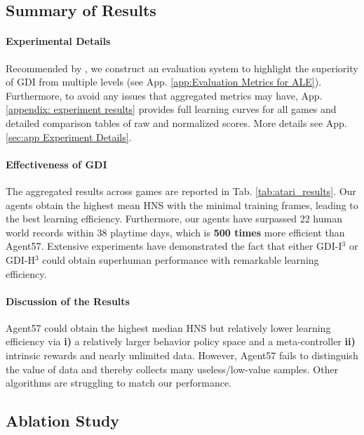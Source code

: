 \subsection{Summary of Results}
\label{sec: Summary of Results}





\paragraph{Experimental Details} Recommended by \citep{agent57,atarihuman}, we construct an evaluation system to highlight the superiority of GDI from multiple levels (see App. \ref{app:Evaluation Metrics for ALE}). Furthermore, to avoid any issues that aggregated metrics may have, App. \ref{appendix: experiment results} provides full learning curves for all games and detailed comparison tables of raw and normalized scores. More details see App. \ref{sec:app Experiment Details}.

\paragraph{Effectiveness of GDI} The aggregated results across games are reported in Tab. \ref{tab:atari_results}. Our agents obtain the highest mean HNS with the minimal training frames, leading to the best learning efficiency. Furthermore, our agents have surpassed 22 human world records within  38 playtime days, which is \textbf{500 times} more efficient than Agent57. Extensive experiments have demonstrated the fact that either GDI-I$^3$ or GDI-H$^3$ could obtain  superhuman performance with remarkable learning efficiency. 


\paragraph{Discussion of the Results} Agent57 could obtain the highest median HNS but relatively lower learning efficiency via \textbf{i)} a relatively larger behavior policy space and  a meta-controller \textbf{ii)} intrinsic rewards and nearly unlimited data. However, Agent57 fails to distinguish the value of data and thereby collects many useless/low-value samples.  Other algorithms are struggling to match our performance.



\subsection{Ablation Study}


